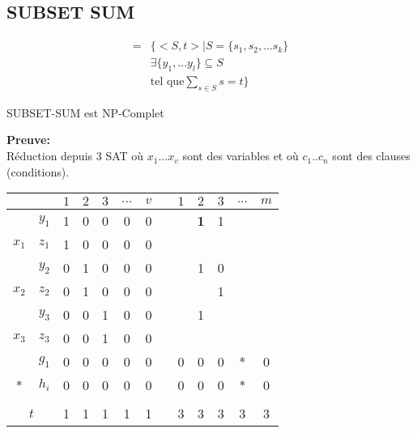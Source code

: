\documentclass[a4paper,12pt]{article}
\begin{document}
  \subsection{SUBSET SUM}
    \begin{align*}
      = &\Big\{ <S, t> | S = \{s_1, s_2, ... s_k\}\\
      &\exists \{y_1, ... y_l\} \subseteq S\\
      &\text{tel que} \sum\limits_{s \in S} s = t \Big\}
    \end{align*}

    \begin{theoremeBox}
      SUBSET-SUM est NP-Complet
    \end{theoremeBox}
    \textbf{Preuve:}\\
    Réduction depuis 3 SAT où $x_1 ... x_v$ sont des variables et où $c_1 .. c_n$ sont des clauses (conditions).

    \begin{table}[h]
      \centering
      \begin{tabular}{c|c|c|c|c|c|c|c|c|c|c|c|c|}
	\cline{3-13}
	\multicolumn{2}{c|}{} & $1$ & $2$ & $3$ & $...$ & $v$ &  & $1$ & $2$ & $3$ & $...$ & $m$ \\ \hline
	\multicolumn{1}{|c|}{} & $y_1$ & 1 & 0 & 0 & 0 & 0 &  &  & {\color[HTML]{32CB00} \textbf{1}} & 1 &  &  \\ \cline{2-13}
	\multicolumn{1}{|c|}{\multirow{-2}{*}{$x_1$}} & $z_1$ & 1 & 0 & 0 & 0 & 0 &  &  &  &  &  &  \\ \hline
	\multicolumn{1}{|c|}{} & $y_2$ & 0 & 1 & 0 & 0 & 0 &  &  & 1 & 0 &  &  \\ \cline{2-13}
	\multicolumn{1}{|c|}{\multirow{-2}{*}{$x_2$}} & $z_2$ & 0 & 1 & 0 & 0 & 0 &  &  &  & {\color[HTML]{FD6864} 1} &  &  \\ \hline
	\multicolumn{1}{|c|}{} & $y_3$ & 0 & 0 & 1 & 0 & 0 &  &  & 1 &  &  &  \\ \cline{2-13}
	\multicolumn{1}{|c|}{\multirow{-2}{*}{$x_3$}} & $z_3$ & 0 & 0 & 1 & 0 & 0 &  &  &  &  &  &  \\ \hline
	\multicolumn{1}{|c|}{} & $g_1$ & 0 & 0 & 0 & 0 & 0 &  & 0 & 0 & 0 & * & 0 \\ \cline{2-13}
	\multicolumn{1}{|c|}{\multirow{-2}{*}{*}} & $h_i$ & 0 & 0 & 0 & 0 & 0 &  & 0 & 0 & 0 & * & 0 \\ \hline
	\multicolumn{2}{|c|}{} &  &  &  &  &  &  &  &  &  &  &  \\ \hline
	\multicolumn{2}{|c|}{$t$} & 1 & 1 & 1 & 1 & 1 &  & 3 & 3 & 3 & 3 & 3 \\ \hline
      \end{tabular}
    \end{table}
\end{document}

